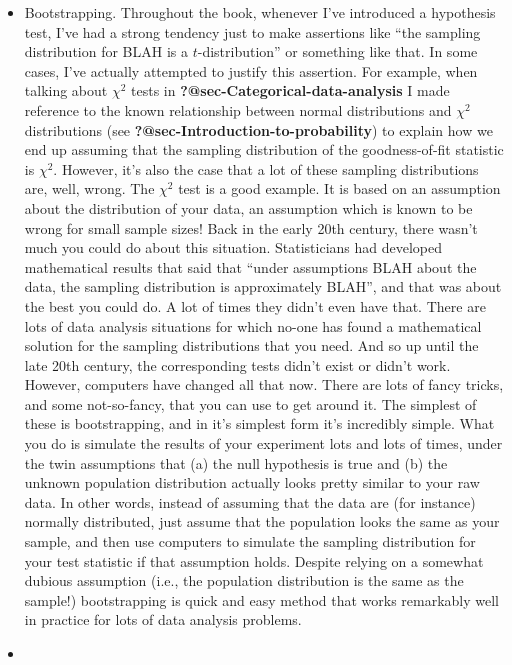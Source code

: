 \documentclass[
  a4paper,
]{book}
\begin{document}
\begin{itemize}
\item
  Bootstrapping. Throughout the book, whenever I've introduced a
  hypothesis test, I've had a strong tendency just to make assertions
  like ``the sampling distribution for BLAH is a \(t\)-distribution'' or
  something like that. In some cases, I've actually attempted to justify
  this assertion. For example, when talking about \(\chi^2\) tests in
  \textbf{?@sec-Categorical-data-analysis} I made reference to the known
  relationship between normal distributions and \(\chi^2\) distributions
  (see \textbf{?@sec-Introduction-to-probability}) to explain how we end
  up assuming that the sampling distribution of the goodness-of-fit
  statistic is \(\chi^2\). However, it's also the case that a lot of
  these sampling distributions are, well, wrong. The \(\chi^2\) test is
  a good example. It is based on an assumption about the distribution of
  your data, an assumption which is known to be wrong for small sample
  sizes! Back in the early 20th century, there wasn't much you could do
  about this situation. Statisticians had developed mathematical results
  that said that ``under assumptions BLAH about the data, the sampling
  distribution is approximately BLAH'', and that was about the best you
  could do. A lot of times they didn't even have that. There are lots of
  data analysis situations for which no-one has found a mathematical
  solution for the sampling distributions that you need. And so up until
  the late 20th century, the corresponding tests didn't exist or didn't
  work. However, computers have changed all that now. There are lots of
  fancy tricks, and some not-so-fancy, that you can use to get around
  it. The simplest of these is bootstrapping, and in it's simplest form
  it's incredibly simple. What you do is simulate the results of your
  experiment lots and lots of times, under the twin assumptions that (a)
  the null hypothesis is true and (b) the unknown population
  distribution actually looks pretty similar to your raw data. In other
  words, instead of assuming that the data are (for instance) normally
  distributed, just assume that the population looks the same as your
  sample, and then use computers to simulate the sampling distribution
  for your test statistic if that assumption holds. Despite relying on a
  somewhat dubious assumption (i.e., the population distribution is the
  same as the sample!) bootstrapping is quick and easy method that works
  remarkably well in practice for lots of data analysis problems.
\item

\end{itemize}
\end{document}
